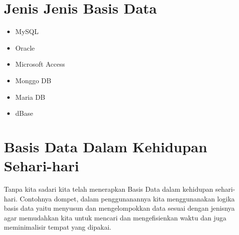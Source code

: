 \documentclass{article}
\begin{document}
\section{Jenis Jenis Basis Data}
\begin{itemize}
    \item MySQL
    \item Oracle
    \item Microsoft Access
    \item Monggo DB
    \item Maria DB
    \item dBase
\end{itemize}

\section{Basis Data Dalam Kehidupan Sehari-hari}
Tanpa kita sadari kita telah menerapkan Basis Data dalam kehidupan sehari-hari. Contohnya dompet, dalam penggunanannya kita menggunanakan logika basis data yaitu menyusun dan mengelompokkan data sesuai dengan jenisnya agar memudahkan kita untuk mencari dan mengefisienkan waktu dan juga meminimalisir tempat yang dipakai.


\end{document}
